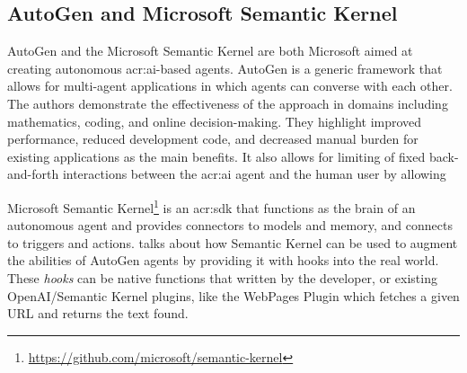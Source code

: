\subsection{AutoGen and Microsoft Semantic Kernel}\label{subsubsec:microsoft-semantic-kernel}

AutoGen and the Microsoft Semantic Kernel are both Microsoft aimed at creating autonomous \acrshort{acr:ai}-based agents. AutoGen \cite{wuAutoGenEnablingNextGen2023} is a generic framework that allows for multi-agent applications in which agents can converse with each other. The authors demonstrate the effectiveness of the approach in domains including mathematics, coding, and online decision-making. They highlight improved performance, reduced development code, and decreased manual burden for existing applications as the main benefits. It also allows for limiting of fixed back-and-forth interactions between the \acrshort{acr:ai} agent and the human user by allowing

Microsoft Semantic Kernel\footnote{\url{https://github.com/microsoft/semantic-kernel}} is an \acrshort{acr:sdk} that functions as the brain of an autonomous agent and provides connectors to models and memory, and connects to triggers and actions. \cite{maedaAutoGenAgentsMeet2023} talks about how Semantic Kernel can be used to augment the abilities of AutoGen agents by providing it with hooks into the real world. These \textit{hooks} can be native functions that written by the developer, or existing OpenAI/Semantic Kernel plugins, like the WebPages Plugin which fetches a given URL and returns the text found.

\glsresetall